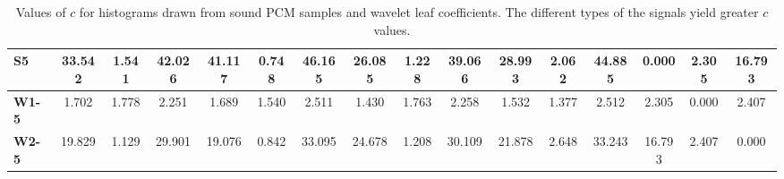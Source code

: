 \begin{table*}[h!]
\begin{center}
\begin{tabular}{| l || c | c | c || c | c | c || c | c | c || c | c | c || c | c | c |}
{\bf S5} & 33.542 & 1.541 & 42.026 & 41.117 & 0.748 & 46.165 & 26.085 & 1.228 & 39.066 & 28.993 & 2.062 & 44.885 & 0.000 & 2.305 & 16.793 \\\hline
{\bf W1-5} & 1.702 & 1.778 & 2.251 & 1.689 & 1.540 & 2.511 & 1.430 & 1.763 & 2.258 & 1.532 & 1.377 & 2.512 & 2.305 & 0.000 & 2.407 \\\hline
{\bf W2-5} & 19.829 & 1.129 & 29.901 & 19.076 & 0.842 & 33.095 & 24.678 & 1.208 & 30.109 & 21.878 & 2.648 & 33.243 & 16.793 & 2.407 & 0.000 \\\hline
\end{tabular}
\caption{Values of $c$ for histograms drawn from sound PCM samples and wavelet leaf coefficients.
The different types of the signals yield greater $c$ values.}
\end{center}
\end{table*}